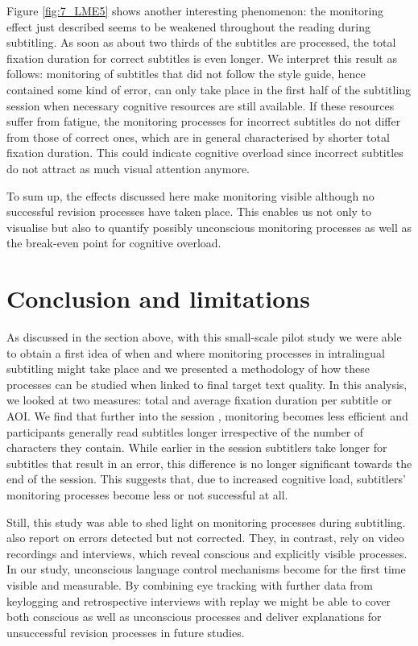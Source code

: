 \documentclass[output=paper]{langscibook}
\begin{document}
Figure \ref{fig:7_LME5} shows another interesting phenomenon: the monitoring effect just described seems to be weakened throughout the reading during subtitling.
As soon as about two thirds of the subtitles are processed, the total fixation duration for correct subtitles is even longer.
We interpret this result as follows: monitoring of subtitles that did not follow the style guide, hence contained some kind of error, can only take place in the first half of the subtitling session when necessary cognitive resources are still available.
If these resources suffer from fatigue, the monitoring processes for incorrect subtitles do not differ from those of correct ones, which are in general characterised by shorter total fixation duration.
This could indicate cognitive overload since incorrect subtitles do not attract as much visual attention anymore.

To sum up, the effects discussed here make monitoring visible although no successful revision processes have taken place.
This enables us not only to visualise but also to quantify possibly unconscious monitoring processes as well as the break-even point for cognitive overload.

\section{Conclusion and limitations}
As discussed in the section above, with this small-scale pilot study we were able to obtain a first idea of when and where monitoring processes in intralingual subtitling might take place and we presented a methodology of how these processes can be studied when linked to final target text quality.
In this analysis, we looked at two measures: total and average fixation duration per subtitle or AOI.
We find that further into the session , monitoring becomes less efficient and participants generally read subtitles longer irrespective of the number of characters they contain.
While earlier in the session subtitlers take longer for subtitles that result in an error, this difference is no longer significant towards the end of the session.
This suggests that, due to increased cognitive load, subtitlers' monitoring processes become less or not successful at all.

Still, this study was able to shed light on monitoring processes during subtitling.
\citet{ipsen-dam2016} also report on errors detected but not corrected.
They, in contrast, rely on video recordings and interviews, which reveal conscious and explicitly visible processes.
In our study, unconscious language control mechanisms become for the first time visible and measurable.
By combining eye tracking with further data from keylogging and retrospective interviews with replay we might be able to cover both conscious as well as unconscious processes and deliver explanations for unsuccessful revision processes in future studies.
\end{document}
